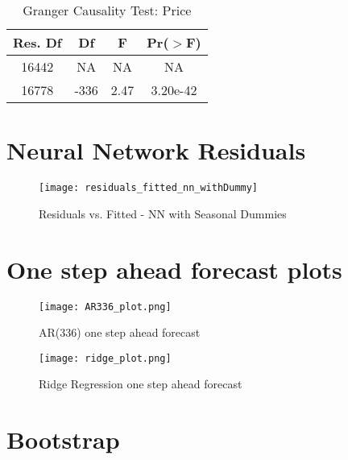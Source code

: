 \documentclass[11pt]{article}
\begin{document}
\begin{table}[H]
\centering
\caption{Granger Causality Test: Price}
\label{table:granger_price}
\begin{tabular}{@{}cccc@{}}
\toprule
 \textbf{Res. Df} & \textbf{Df} & \textbf{F} & \textbf{Pr($>$F)} \\ \midrule
16442 & NA & NA & NA \\
16778 & -336 & 2.47 & 3.20e-42\\ \bottomrule
\end{tabular}
\end{table}


\section{Neural Network Residuals}
\label{appendix:nn_residuals}

\begin{figure}[H]
\centering
\begin{minipage}{.35\textwidth}
  \centering
  \texttt{[image: residuals\_fitted\_nn\_withDummy]}
   \caption{Residuals vs. Fitted - NN with Seasonal Dummies}
   \label{fig:residuals_fitted_nn_withDummy}
\end{minipage}%
\end{figure}


\section{One step ahead forecast plots}
\label{appendix:forecast plots}

\begin{figure}[H]
\centering
\begin{minipage}{0.8\textwidth}
  \centering
  \texttt{[image: AR336\_plot.png]}
   \caption{AR(336) one step ahead forecast}
   \label{fig:AR336_plot}
\end{minipage}%
\end{figure}

\begin{figure}[H]
\centering
\begin{minipage}{0.8\textwidth}
  \centering
  \texttt{[image: ridge\_plot.png]}
   \caption{Ridge Regression one step ahead forecast}
   \label{fig: ridge_plot}
\end{minipage}%
\end{figure}

\section{Bootstrap}
\label{appendix:bootstrap}
\end{document}
